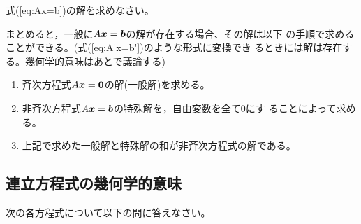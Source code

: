 \documentclass[twocolumn,11pt]{jarticle}
\begin{document}
\nquestion 式(\ref{eq:Ax=b})の解を求めなさい。

\comment
まとめると，一般に$A\boldsymbol{x}=\boldsymbol{b}$の解が存在する場合、その解は以下
の手順で求めることができる。(式(\ref{eq:A'x=b'})のような形式に変換でき
るときには解は存在する。幾何学的意味はあとで議論する)
\begin{enumerate}
\item 斉次方程式$A\boldsymbol{x}=\boldsymbol{0}$の解(一般解)を求める。
\item 非斉次方程式$A\boldsymbol{x}=\boldsymbol{b}$の特殊解を，自由変数を全て0にす
  ることによって求める。
\item 上記で求めた一般解と特殊解の和が非斉次方程式の解である。
\end{enumerate}%

\subsection{連立方程式の幾何学的意味}

次の各方程式について以下の問に答えなさい。
\end{document}
